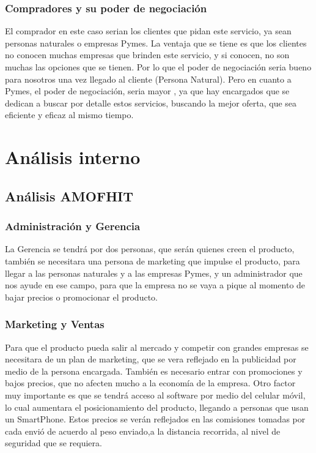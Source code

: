 \subsubsection{Compradores y su poder de negociación}
El comprador en este caso serian los clientes que pidan este servicio, ya sean personas naturales o empresas Pymes. La ventaja que se tiene es que los clientes no conocen muchas empresas que brinden este servicio, y si conocen, no son muchas las opciones que se tienen. Por lo que el poder de negociación seria bueno para nosotros una vez llegado al cliente (Persona Natural).
Pero en cuanto a Pymes, el poder de negociación, seria mayor , ya que hay encargados que se dedican a buscar por detalle estos servicios, buscando la mejor oferta, que sea eficiente y eficaz al mismo tiempo.
\section{Análisis interno}

\subsection{Análisis AMOFHIT}
\subsubsection{Administración y Gerencia}
La Gerencia se tendrá por dos personas, que serán quienes creen el producto, también se necesitara una persona de marketing que impulse el producto, para llegar a las personas naturales y a las empresas Pymes, y un administrador que nos ayude en ese campo, para que la empresa no se vaya a pique al momento de bajar precios o promocionar el producto. 

\subsubsection{Marketing y Ventas}
Para que el producto pueda salir al mercado y competir con grandes empresas se necesitara de un plan de marketing, que se vera reflejado en la publicidad por medio de la persona encargada. También es necesario entrar con promociones y bajos precios, que no afecten mucho a la economía de la empresa. Otro factor muy importante es que se tendrá acceso al software por medio del celular móvil, lo cual aumentara el posicionamiento del producto, llegando a personas que usan un SmartPhone.
Estos precios se verán reflejados en las comisiones tomadas por cada envió de acuerdo al peso enviado,a la distancia recorrida, al nivel de seguridad que se requiera.

